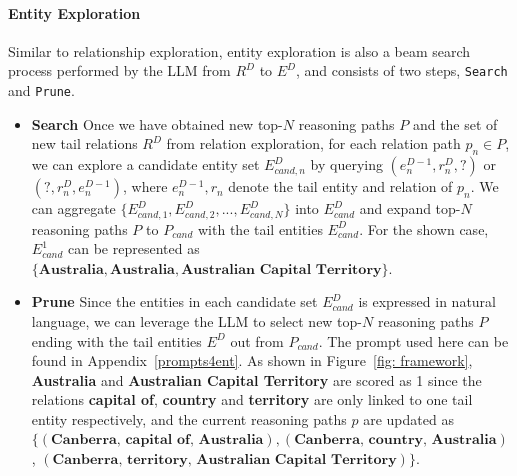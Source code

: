\documentclass{article} %
\begin{document}
\paragraph{Entity Exploration}
\label{sec: entity_exploration}
Similar to relationship exploration, entity exploration is also a beam search process performed by the LLM from $R^{D}$ to $E^{D}$, and consists of two steps, \texttt{Search} and \texttt{Prune}.
\begin{itemize}[leftmargin=*]
    \item \textbf{Search} Once we have obtained new top-$N$ reasoning paths $P$ and the set of new tail relations $R^{D}$ from relation exploration, for each relation path $p_n\in P$, we can explore a candidate entity set $E^{D}_{cand,n}$ by querying $(e^{D-1}_n, r^{D}_n,?)$ or $(?, r^{D}_n,e^{D-1}_n)$, where $e^{D-1}_n, r_n$ denote the tail entity and relation of $p_n$. We can aggregate $\{E^{D}_{cand,1},E^{D}_{cand,2},...,E^{D}_{cand,N}\}$ into $E^{D}_{cand}$ and expand top-$N$ reasoning paths $P$ to $P_{cand}$ with the tail entities $E^{D}_{cand}$.
    For the shown case, $E^{1}_{cand}$ can be represented as  $\{\textbf{Australia},\textbf{Australia}, \textbf{Australian Capital Territory}\}$.
    \item \textbf{Prune} Since the entities in each candidate set $E^{D}_{cand}$ is expressed in natural language, we can leverage the LLM to select new top-$N$ reasoning paths $P$ ending with the tail entities $E^{D}$ out from $P_{cand}$. The prompt used here can be found in Appendix~\ref{prompts4ent}. As shown in Figure~\ref{fig: framework}, \textbf{Australia} and \textbf{Australian Capital Territory} are scored as 1 since the relations \textbf{capital of}, \textbf{country} and \textbf{territory} are only linked to one tail entity respectively, and the current reasoning paths $p$ are updated as $\{(\textbf{Canberra, capital of, Australia}),(\textbf{Canberra, country, Australia})$, $(\textbf{Canberra, territory, Australian Capital Territory})\}$.
    
\end{itemize}
\end{document}
